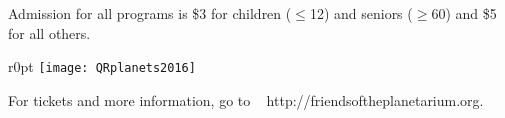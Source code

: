 \documentclass{article}
\begin{document}
\medskip

   {\fontsize{16}{18}

Admission for all programs is \$3 for children ($\le$12) and seniors ($\ge$60) and \$5 for all others.

   }



\medskip

   {\fontsize{18}{18}


   \begin{wrapfigure}[2]{r}{0pt}
      \texttt{[image: QRplanets2016]}
   \end{wrapfigure}      
   
\qquad\qquad\qquad\qquad   For tickets and more information, go to \break
  \qquad\qquad\qquad\qquad  http://friendsoftheplanetarium.org.


}



\end{document}
